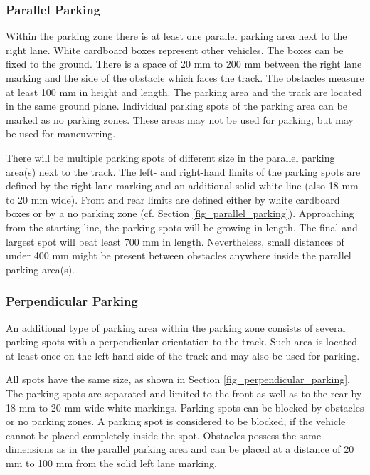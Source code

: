 \documentclass[a4paper]{report}
\begin{document}
\subsubsection{Parallel Parking}

Within the parking zone there is at least one parallel parking area next to the
right lane. White cardboard boxes represent other vehicles. The boxes can be
fixed to the ground. There is a space of 20 mm to 200 mm between the right lane
marking and the side of the obstacle which faces the track. The obstacles
measure at least 100 mm in height and length. The parking area and the track
are located in the same ground plane. Individual parking spots of the parking
area can be marked as no parking zones. These areas may not be used for
parking, but may be used for maneuvering.

There will be multiple parking spots of different size in the parallel parking
area(s) next to the track. The left- and right-hand limits of the parking spots
are defined by the right lane marking and an additional solid white line (also
18 mm to 20 mm wide). Front and rear limits are defined either by white
cardboard boxes or by a no parking zone (cf. Section
\ref{fig_parallel_parking}). Approaching from the starting line, the parking
spots will be growing in length. The final and largest spot will beat least 700
mm in length. Nevertheless, small distances of under 400 mm might be present
between obstacles anywhere inside the parallel parking area(s).

\subsubsection{Perpendicular Parking}

An additional type of parking area within the parking zone consists of several
parking spots with a perpendicular orientation to the track. Such area is
located at least once on the left-hand side of the track and may also be used
for parking.

All spots have the same size, as shown in Section
\ref{fig_perpendicular_parking}. The parking spots are separated and limited to
the front as well as to the rear by 18 mm to 20 mm wide white markings. Parking
spots can be blocked by obstacles or no parking zones. A parking spot is
considered to be blocked, if the vehicle cannot be placed completely inside the
spot. Obstacles possess the same dimensions as in the parallel parking area and
can be placed at a distance of 20 mm to 100 mm from the solid left lane
marking.
\end{document}
